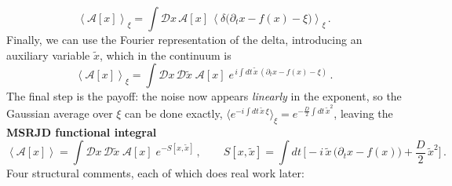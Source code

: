 \documentclass[11pt]{article}
\newcommand{\expval}[1]{\left\langle #1 \right\rangle}
\begin{document}
\begin{equation}
    \expval{\mathcal{A}[x]}_\xi = \int \mathcal{D} x\, \mathcal{A}[x]\, \expval{\delta \big(\partial_t x - f(x) - \xi\big)}_\xi\, .
 \end{equation}
Finally, we can use the Fourier representation of the delta, introducing an auxiliary variable $\tilde{x}$, which in the continuum is 
\begin{equation}
        \expval{\mathcal{A}[x]}_\xi = \int \mathcal{D} x\, \mathcal{D} \tilde{x}\; \mathcal{A}[x]\; e^{\textstyle\, i \int dt\, \tilde{x}\, (\partial_t x - f(x) - \xi)}\,.
\end{equation}
%
The final step is the payoff: the noise now appears \emph{linearly} in the exponent, so the Gaussian average over $\xi$ can be done exactly, $\big\langle e^{-i\int dt\, \tilde x\, \xi}\big\rangle_\xi = e^{-\frac{D}{2}\int dt\, \tilde x^2}$, leaving the \textbf{MSRJD functional integral}
%
\begin{equation} \label{msrjd-action}
    \expval{\mathcal{A}[x]} = \int \mathcal{D} x\, \mathcal{D} \tilde{x}\; \mathcal{A}[x]\; e^{-S[x,\tilde x]}\,,
    \qquad
    S[x,\tilde x] = \int dt\, \Big[ -i\,\tilde{x}\, \big(\partial_t x - f(x)\big) + \frac{D}{2}\, \tilde x^2 \Big]\,.
\end{equation}
%
Four structural comments, each of which does real work later:
%
\end{document}
